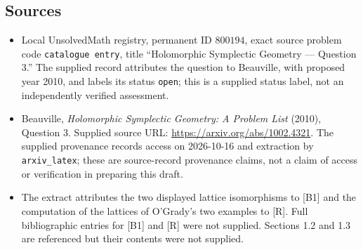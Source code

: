 \documentclass[11pt]{article}
\begin{document}
\subsection{Sources}
\begin{itemize}
\item Local UnsolvedMath registry, permanent ID \(800194\), exact source problem code \texttt{catalogue entry}, title ``Holomorphic Symplectic Geometry --- Question 3.'' The supplied record attributes the question to Beauville, with proposed year 2010, and labels its status \texttt{open}; this is a supplied status label, not an independently verified assessment.
\item Beauville, \emph{Holomorphic Symplectic Geometry: A Problem List} (2010), Question 3. Supplied source URL: \url{https://arxiv.org/abs/1002.4321}. The supplied provenance records access on 2026-10-16 and extraction by \texttt{arxiv\_latex}; these are source-record provenance claims, not a claim of access or verification in preparing this draft.
\item The extract attributes the two displayed lattice isomorphisms to [B1] and the computation of the lattices of O'Grady's two examples to [R]. Full bibliographic entries for [B1] and [R] were not supplied. Sections 1.2 and 1.3 are referenced but their contents were not supplied.
\end{itemize}
\end{document}
